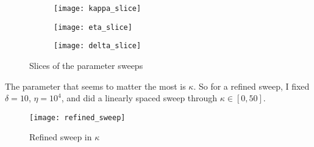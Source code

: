 \documentclass{article}
\begin{document}
\begin{figure}
  \centering
  \begin{subfigure}{0.48\linewidth}
    \texttt{[image: kappa\_slice]}
  \end{subfigure}
  \hfill
  \begin{subfigure}{0.48\linewidth}
    \texttt{[image: eta\_slice]}
  \end{subfigure}
  \begin{subfigure}{0.48\linewidth}
    \texttt{[image: delta\_slice]}
  \end{subfigure}
  \caption{Slices of the parameter sweeps}
  \label{fig:coarse_slices}
\end{figure}

The parameter that seems to matter the most is $\kappa$. So for a
refined sweep, I fixed $\delta = 10$, $\eta = 10^4$, and did a
linearly spaced sweep through $\kappa \in [0, 50]$.

\begin{figure}
  \centering
  \texttt{[image: refined\_sweep]}
  \caption{Refined sweep in $\kappa$}
  \label{fig:refined-sweep}
\end{figure}






\end{document}
